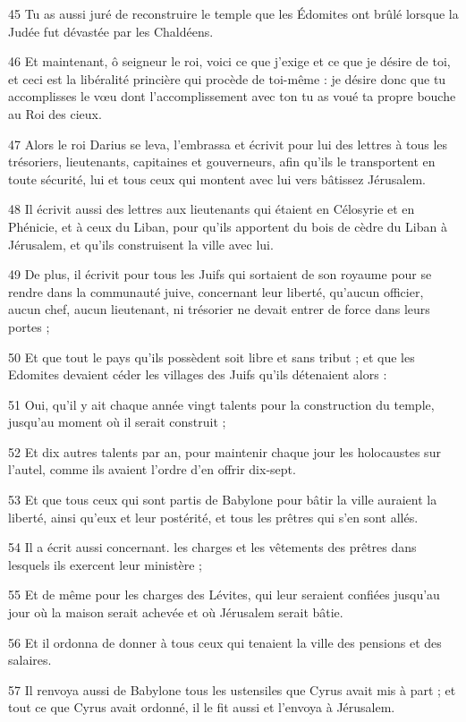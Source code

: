 \par 45 Tu as aussi juré de reconstruire le temple que les Édomites ont brûlé lorsque la Judée fut dévastée par les Chaldéens.
\par 46 Et maintenant, ô seigneur le roi, voici ce que j'exige et ce que je désire de toi, et ceci est la libéralité princière qui procède de toi-même : je désire donc que tu accomplisses le vœu dont l'accomplissement avec ton tu as voué ta propre bouche au Roi des cieux.
\par 47 Alors le roi Darius se leva, l'embrassa et écrivit pour lui des lettres à tous les trésoriers, lieutenants, capitaines et gouverneurs, afin qu'ils le transportent en toute sécurité, lui et tous ceux qui montent avec lui vers bâtissez Jérusalem.
\par 48 Il écrivit aussi des lettres aux lieutenants qui étaient en Célosyrie et en Phénicie, et à ceux du Liban, pour qu'ils apportent du bois de cèdre du Liban à Jérusalem, et qu'ils construisent la ville avec lui.
\par 49 De plus, il écrivit pour tous les Juifs qui sortaient de son royaume pour se rendre dans la communauté juive, concernant leur liberté, qu'aucun officier, aucun chef, aucun lieutenant, ni trésorier ne devait entrer de force dans leurs portes ;
\par 50 Et que tout le pays qu'ils possèdent soit libre et sans tribut ; et que les Edomites devaient céder les villages des Juifs qu'ils détenaient alors :
\par 51 Oui, qu'il y ait chaque année vingt talents pour la construction du temple, jusqu'au moment où il serait construit ;
\par 52 Et dix autres talents par an, pour maintenir chaque jour les holocaustes sur l'autel, comme ils avaient l'ordre d'en offrir dix-sept.
\par 53 Et que tous ceux qui sont partis de Babylone pour bâtir la ville auraient la liberté, ainsi qu'eux et leur postérité, et tous les prêtres qui s'en sont allés.
\par 54 Il a écrit aussi concernant. les charges et les vêtements des prêtres dans lesquels ils exercent leur ministère ;
\par 55 Et de même pour les charges des Lévites, qui leur seraient confiées jusqu'au jour où la maison serait achevée et où Jérusalem serait bâtie.
\par 56 Et il ordonna de donner à tous ceux qui tenaient la ville des pensions et des salaires.
\par 57 Il renvoya aussi de Babylone tous les ustensiles que Cyrus avait mis à part ; et tout ce que Cyrus avait ordonné, il le fit aussi et l'envoya à Jérusalem.
